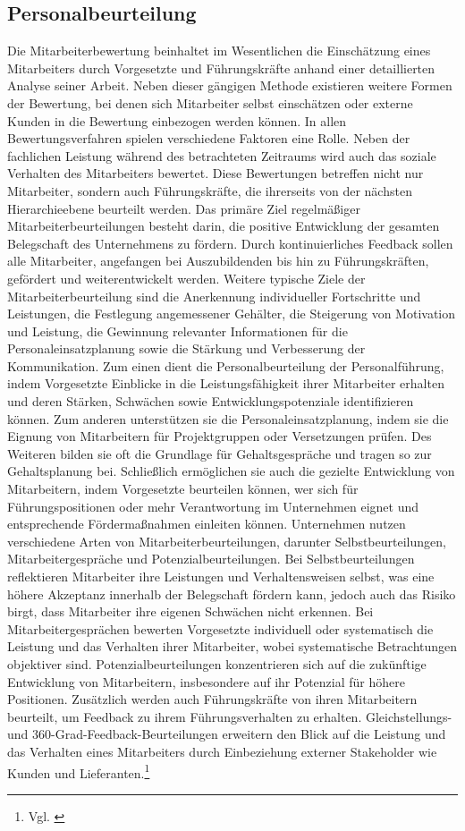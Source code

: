 \subsection{Personalbeurteilung}
Die Mitarbeiterbewertung beinhaltet im Wesentlichen die Einschätzung eines Mitarbeiters durch Vorgesetzte und Führungskräfte anhand einer detaillierten Analyse seiner Arbeit. Neben dieser gängigen Methode existieren weitere Formen der Bewertung, bei denen sich Mitarbeiter selbst einschätzen oder externe Kunden in die Bewertung einbezogen werden können. In allen Bewertungsverfahren spielen verschiedene Faktoren eine Rolle. Neben der fachlichen Leistung während des betrachteten Zeitraums wird auch das soziale Verhalten des Mitarbeiters bewertet. Diese Bewertungen betreffen nicht nur Mitarbeiter, sondern auch Führungskräfte, die ihrerseits von der nächsten Hierarchieebene beurteilt werden. Das primäre Ziel regelmäßiger Mitarbeiterbeurteilungen besteht darin, die positive Entwicklung der gesamten Belegschaft des Unternehmens zu fördern. Durch kontinuierliches Feedback sollen alle Mitarbeiter, angefangen bei Auszubildenden bis hin zu Führungskräften, gefördert und weiterentwickelt werden. Weitere typische Ziele der Mitarbeiterbeurteilung sind die Anerkennung individueller Fortschritte und Leistungen, die Festlegung angemessener Gehälter, die Steigerung von Motivation und Leistung, die Gewinnung relevanter Informationen für die Personaleinsatzplanung sowie die Stärkung und Verbesserung der Kommunikation.  Zum einen dient die Personalbeurteilung der Personalführung, indem Vorgesetzte Einblicke in die Leistungsfähigkeit ihrer Mitarbeiter erhalten und deren Stärken, Schwächen sowie Entwicklungspotenziale identifizieren können. Zum anderen unterstützen sie die Personaleinsatzplanung, indem sie die Eignung von Mitarbeitern für Projektgruppen oder Versetzungen prüfen. Des Weiteren bilden sie oft die Grundlage für Gehaltsgespräche und tragen so zur Gehaltsplanung bei. Schließlich ermöglichen sie auch die gezielte Entwicklung von Mitarbeitern, indem Vorgesetzte beurteilen können, wer sich für Führungspositionen oder mehr Verantwortung im Unternehmen eignet und entsprechende Fördermaßnahmen einleiten können. Unternehmen nutzen verschiedene Arten von Mitarbeiterbeurteilungen, darunter Selbstbeurteilungen, Mitarbeitergespräche und Potenzialbeurteilungen. Bei Selbstbeurteilungen reflektieren Mitarbeiter ihre Leistungen und Verhaltensweisen selbst, was eine höhere Akzeptanz innerhalb der Belegschaft fördern kann, jedoch auch das Risiko birgt, dass Mitarbeiter ihre eigenen Schwächen nicht erkennen. Bei Mitarbeitergesprächen bewerten Vorgesetzte individuell oder systematisch die Leistung und das Verhalten ihrer Mitarbeiter, wobei systematische Betrachtungen objektiver sind. Potenzialbeurteilungen konzentrieren sich auf die zukünftige Entwicklung von Mitarbeitern, insbesondere auf ihr Potenzial für höhere Positionen. Zusätzlich werden auch Führungskräfte von ihren Mitarbeitern beurteilt, um Feedback zu ihrem Führungsverhalten zu erhalten. Gleichstellungs- und 360-Grad-Feedback-Beurteilungen erweitern den Blick auf die Leistung und das Verhalten eines Mitarbeiters durch Einbeziehung externer Stakeholder wie Kunden und Lieferanten.\footnote{Vgl. \cite{Striegel2023}}

\newpage
